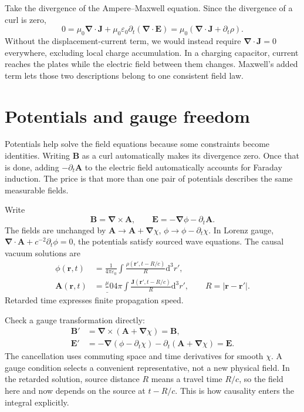 \documentclass[11pt,oneside]{book}
\newcommand{\dd}{\mathrm{d}}
\newcommand{\vect}[1]{\boldsymbol{#1}}
\newcommand{\grad}{\boldsymbol{\nabla}}
\newcommand{\eps}{\varepsilon_0}
\newcommand{\mun}{\mu_0}
\theoremstyle{reviewstyle}
\begin{document}
Take the divergence of the Ampere--Maxwell equation. Since the divergence of a curl is zero,
\begin{equation}
0=\mun\grad\cdot\vect J+\mun\eps\partial_t(\grad\cdot\vect E)
=\mun(\grad\cdot\vect J+\partial_t\rho).
\end{equation}
Without the displacement-current term, we would instead require $\grad\cdot\vect J=0$ everywhere, excluding local charge accumulation. In a charging capacitor, current reaches the plates while the electric field between them changes. Maxwell's added term lets those two descriptions belong to one consistent field law.

\section{Potentials and gauge freedom}
Potentials help solve the field equations because some constraints become identities. Writing $\vect B$ as a curl automatically makes its divergence zero. Once that is done, adding $-\partial_t\vect A$ to the electric field automatically accounts for Faraday induction. The price is that more than one pair of potentials describes the same measurable fields.

Write
\begin{equation}\vect B=\grad\times\vect A,\qquad \vect E=-\grad\phi-\partial_t\vect A.\end{equation}
The fields are unchanged by $\vect A\to\vect A+\grad\chi$, $\phi\to\phi-\partial_t\chi$. In Lorenz gauge, $\grad\cdot\vect A+c^{-2}\partial_t\phi=0$, the potentials satisfy sourced wave equations. The causal vacuum solutions are
\begin{align}
\phi(\vect r,t)&=\frac1{4\pi\eps}\int\frac{\rho(\vect r',t-R/c)}R\dd^3r',\\
\vect A(\vect r,t)&=\frac\mun{4\pi}\int\frac{\vect J(\vect r',t-R/c)}R\dd^3r',\qquad R=|\vect r-\vect r'|.
\end{align}
Retarded time expresses finite propagation speed.

Check a gauge transformation directly:
\begin{align}
\vect B'&=\grad\times(\vect A+\grad\chi)=\vect B,\\
\vect E'&=-\grad(\phi-\partial_t\chi)-\partial_t(\vect A+\grad\chi)
=\vect E.
\end{align}
The cancellation uses commuting space and time derivatives for smooth $\chi$. A gauge condition selects a convenient representative, not a new physical field. In the retarded solution, source distance $R$ means a travel time $R/c$, so the field here and now depends on the source at $t-R/c$. This is how causality enters the integral explicitly.
\end{document}
